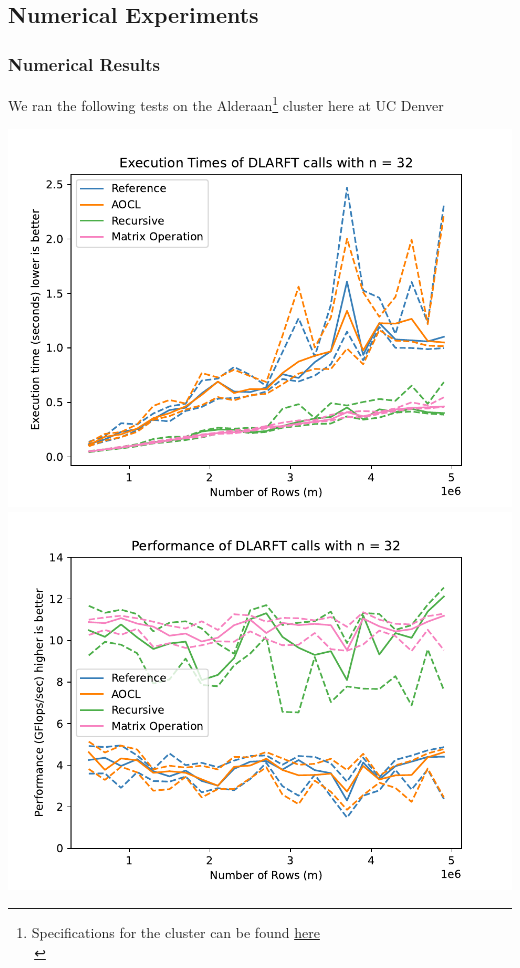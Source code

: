 \documentclass[12pt,aspectratio=169]{beamer}
\begin{document}
    \subsection{Numerical Experiments}
    \begin{frame}
        \frametitle{Numerical Results}
        We ran the following tests on the Alderaan\footnote{Specifications for the cluster can be found 
        \textcolor{blue}{\href{https://ccm-docs.readthedocs.io/en/latest/alderaan\#hardware}{here}}\\\,} 
        cluster here at UC Denver\\
        \begin{center}
        \includegraphics[width=.45\textwidth]{figures/timeDLARFT.pdf}
        \includegraphics[width=.45\textwidth]{figures/flopDLARFT.pdf}
        \end{center}
    \end{frame}
\end{document}
